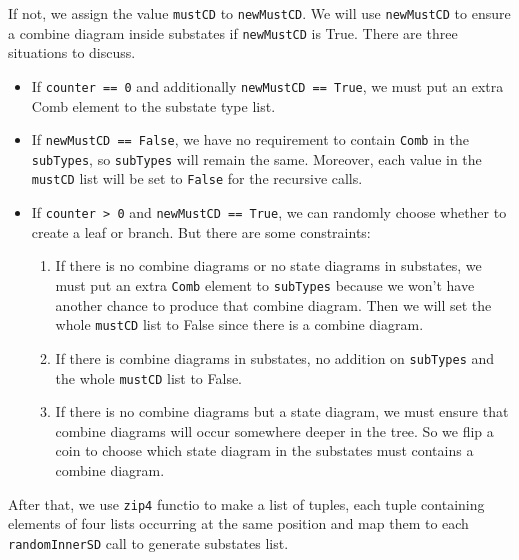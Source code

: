 If not, we assign the value \verb|mustCD| to \verb|newMustCD|.
We will use \verb|newMustCD| to ensure a combine diagram inside substates if \verb|newMustCD| is True.
There are three situations to discuss.
\begin{itemize}
\item If \verb|counter == 0| and  additionally \verb|newMustCD == True|, we must put an extra Comb element to the substate type list.
\end{itemize}
\begin{itemize}
\item If \verb|newMustCD == False|, we have no requirement to contain \verb|Comb| in the \verb|subTypes|, so \verb|subTypes| will remain the same. Moreover, each value in the \verb|mustCD| list will be set to \verb|False| for the recursive calls.
\end{itemize}
\begin{itemize}
\item If \verb|counter > 0| and \verb|newMustCD == True|,  we can randomly choose whether to create a leaf or branch. But there are some constraints:
\begin{enumerate}
\item If there is no combine diagrams or no state diagrams in substates, we must put an extra \verb|Comb| element to \verb|subTypes| because we won't have another chance to produce that combine diagram. Then we will set the whole \verb|mustCD| list to False since there is a combine diagram.
\item If there is combine diagrams in substates, no addition on \verb|subTypes| and the whole \verb|mustCD| list to False.
\item If there is no combine diagrams but a state diagram, we must ensure that combine diagrams will occur somewhere deeper in the tree. So we flip a coin to choose which state diagram in the substates must contains a combine diagram.
\end{enumerate}
\end{itemize}
After that, we use \verb|zip4| functio to make a list of tuples, each tuple containing elements of four lists occurring at the same position and map them to each \verb|randomInnerSD| call to generate substates list.

